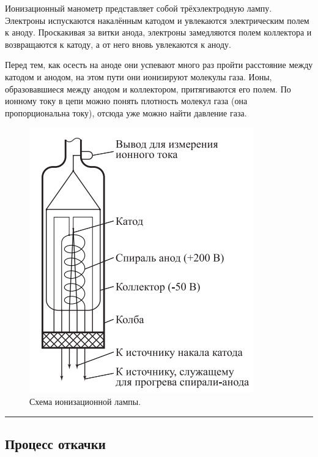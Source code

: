 \documentclass[a4paper,12pt]{report}
\begin{document}
    \begin{multicols}{2}
        Ионизационный манометр представляет собой трёхэлектродную лампу. Электроны испускаются накалённым катодом и увлекаются электрическим полем к аноду. Проскакивая за витки анода, электроны замедляются полем коллектора и возвращаются к катоду, а от него вновь увлекаются к аноду.

        Перед тем, как осесть на аноде они успевают много раз пройти расстояние между катодом и анодом, на этом пути они ионизируют молекулы газа. Ионы, образовавшиеся между анодом и коллектором, притягиваются его полем. По ионному току в цепи можно понять плотность молекул газа (она пропорциональна току), отсюда уже можно найти давление газа. 

        \begin{figure}[H]
            \centering
            \includegraphics[width=0.7\columnwidth]{../img/ion_lamp.png}
            \caption{Схема ионизационной лампы.}
        \end{figure}
    \end{multicols}

    \hrule

    \newpage

    \subsection{Процесс откачки}
\end{document}
